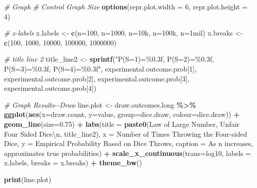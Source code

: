 \documentclass[
]{book}
\newenvironment{Shaded}{\begin{snugshade}}{\end{snugshade}}
\newcommand{\CharTok}[1]{\textcolor[rgb]{0.31,0.60,0.02}{#1}}
\newcommand{\CommentTok}[1]{\textcolor[rgb]{0.56,0.35,0.01}{\textit{#1}}}
\newcommand{\DataTypeTok}[1]{\textcolor[rgb]{0.13,0.29,0.53}{#1}}
\newcommand{\DecValTok}[1]{\textcolor[rgb]{0.00,0.00,0.81}{#1}}
\newcommand{\FloatTok}[1]{\textcolor[rgb]{0.00,0.00,0.81}{#1}}
\newcommand{\KeywordTok}[1]{\textcolor[rgb]{0.13,0.29,0.53}{\textbf{#1}}}
\newcommand{\NormalTok}[1]{#1}
\newcommand{\OperatorTok}[1]{\textcolor[rgb]{0.81,0.36,0.00}{\textbf{#1}}}
\newcommand{\StringTok}[1]{\textcolor[rgb]{0.31,0.60,0.02}{#1}}
\begin{document}
\begin{Shaded}
\begin{Highlighting}[]
\CommentTok{\# Graph}
\CommentTok{\# Control Graph Size}
\KeywordTok{options}\NormalTok{(}\DataTypeTok{repr.plot.width =} \DecValTok{6}\NormalTok{, }\DataTypeTok{repr.plot.height =} \DecValTok{4}\NormalTok{)}

\CommentTok{\# x{-}labels}
\NormalTok{x.labels \textless{}{-}}\StringTok{ }\KeywordTok{c}\NormalTok{(}\StringTok{\textquotesingle{}n=100\textquotesingle{}}\NormalTok{, }\StringTok{\textquotesingle{}n=1000\textquotesingle{}}\NormalTok{, }\StringTok{\textquotesingle{}n=10k\textquotesingle{}}\NormalTok{, }\StringTok{\textquotesingle{}n=100k\textquotesingle{}}\NormalTok{, }\StringTok{\textquotesingle{}n=1mil\textquotesingle{}}\NormalTok{)}
\NormalTok{x.breaks \textless{}{-}}\StringTok{ }\KeywordTok{c}\NormalTok{(}\DecValTok{100}\NormalTok{, }\DecValTok{1000}\NormalTok{, }\DecValTok{10000}\NormalTok{, }\DecValTok{100000}\NormalTok{, }\DecValTok{1000000}\NormalTok{)}

\CommentTok{\# title line 2}
\NormalTok{title\_line2 \textless{}{-}}\StringTok{ }\KeywordTok{sprintf}\NormalTok{(}\StringTok{"P(S=1)=\%0.3f, P(S=2)=\%0.3f, P(S=3)=\%0.3f, P(S=4)=\%0.3f"}\NormalTok{,}
\NormalTok{                   experimental.outcome.prob[}\DecValTok{1}\NormalTok{], experimental.outcome.prob[}\DecValTok{2}\NormalTok{],}
\NormalTok{                   experimental.outcome.prob[}\DecValTok{3}\NormalTok{], experimental.outcome.prob[}\DecValTok{4}\NormalTok{])}

\CommentTok{\# Graph Results{-}{-}Draw}
\NormalTok{line.plot \textless{}{-}}\StringTok{ }\NormalTok{draw.outcomes.long }\OperatorTok{\%\textgreater{}\%}
\StringTok{  }\KeywordTok{ggplot}\NormalTok{(}\KeywordTok{aes}\NormalTok{(}\DataTypeTok{x=}\NormalTok{draw.count, }\DataTypeTok{y=}\NormalTok{value,}
             \DataTypeTok{group=}\NormalTok{dice.draw,}
             \DataTypeTok{colour=}\NormalTok{dice.draw)) }\OperatorTok{+}
\StringTok{  }\KeywordTok{geom\_line}\NormalTok{(}\DataTypeTok{size=}\FloatTok{0.75}\NormalTok{) }\OperatorTok{+}
\StringTok{  }\KeywordTok{labs}\NormalTok{(}\DataTypeTok{title =} \KeywordTok{paste0}\NormalTok{(}\StringTok{\textquotesingle{}Law of Large Number, Unfair Four Sided Dice}\CharTok{\textbackslash{}n}\StringTok{\textquotesingle{}}\NormalTok{, title\_line2),}
       \DataTypeTok{x =} \StringTok{\textquotesingle{}Number of Times Throwing the Four{-}sided Dice\textquotesingle{}}\NormalTok{,}
       \DataTypeTok{y =} \StringTok{\textquotesingle{}Empirical Probability Based on Dice Throws\textquotesingle{}}\NormalTok{,}
       \DataTypeTok{caption =} \StringTok{\textquotesingle{}As n increases, approximates true probabilities\textquotesingle{}}\NormalTok{) }\OperatorTok{+}
\StringTok{  }\KeywordTok{scale\_x\_continuous}\NormalTok{(}\DataTypeTok{trans=}\StringTok{\textquotesingle{}log10\textquotesingle{}}\NormalTok{, }\DataTypeTok{labels =}\NormalTok{ x.labels, }\DataTypeTok{breaks =}\NormalTok{ x.breaks) }\OperatorTok{+}
\StringTok{  }\KeywordTok{theme\_bw}\NormalTok{()}

\KeywordTok{print}\NormalTok{(line.plot)}
\end{Highlighting}
\end{Shaded}
\end{document}
